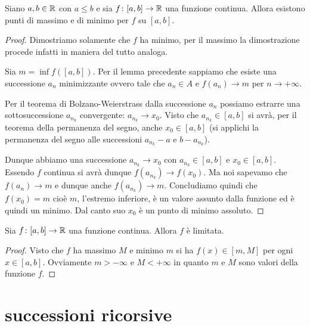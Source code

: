 \begin{theorem}[Weierstrass]%
\mymark{***}%
%
%
%
Siano $a,b\in {\mathbb R}$ con $a\le b$
e sia $f\colon [a,b]\to {\mathbb R}$ una funzione continua.
Allora
esistono punti di massimo e di minimo per $f$ su $[a,b]$.
\end{theorem}
%
\begin{proof}
\mymark{***}%
Dimostriamo solamente che $f$ ha minimo, per il massimo la dimostrazione procede
infatti in maniera del tutto analoga.

Sia $m= \inf f([a,b])$.
Per il lemma precedente sappiamo che esiste una successione $a_n$ minimizzante ovvero tale che
$a_n \in A$ e $f(a_n)\to m$ per $n\to +\infty$.

Per il teorema di Bolzano-Weierstrass dalla successione $a_n$ possiamo estrarre una sottosuccessione 
$a_{n_k}$ convergente: $a_{n_k} \to x_0$.
Visto che $a_{n_k} \in [a,b]$ si avrà, per il teorema della permanenza del segno, anche 
$x_0 \in [a,b]$ (si applichi la permanenza del segno alle successioni $a_{n_k}-a$ e $b-a_{n_k}$).

Dunque abbiamo una successione $a_{n_k}\to x_0$ con $a_{n_k}\in [a,b]$ e
$x_0 \in [a,b]$. Essendo $f$ continua si avrà dunque $f(a_{n_k}) \to f(x_0)$.
Ma noi sapevamo che $f(a_n)\to m$ e dunque anche $f(a_{n_k}) \to m$.
Concludiamo quindi che $f(x_0) = m$ cioè $m$, l'estremo inferiore,
è un valore assunto dalla funzione ed è quindi un minimo.
Dal canto suo $x_0$ è un punto di minimo assoluto.
\end{proof}

\begin{corollary}
Sia $f\colon [a,b]\to {\mathbb R}$ una funzione continua. Allora $f$ è limitata.
\end{corollary}
\begin{proof}
Visto che $f$ ha massimo $M$ e minimo $m$ si ha $f(x)\in [m,M]$ per ogni $x\in[a,b]$.
Ovviamente $m>-\infty$ e $M<+\infty$ in quanto $m$ e $M$ sono valori della funzione $f$.
\end{proof}


\section{successioni ricorsive}

